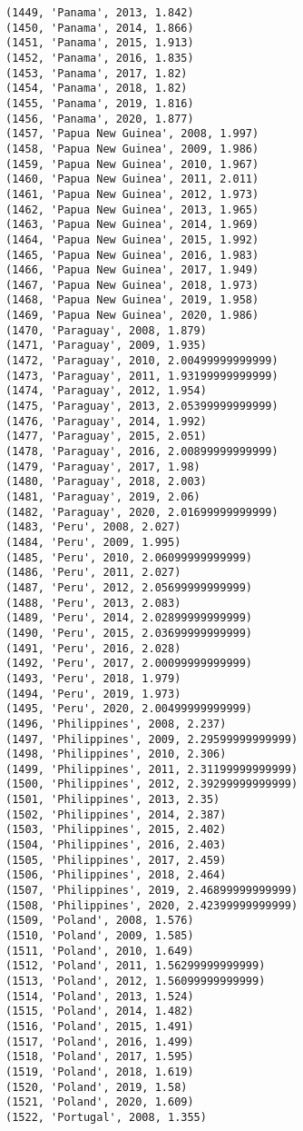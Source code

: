 \documentclass[11pt]{article}
\begin{document}
\begin{Verbatim}[commandchars=\\\{\}]
(1449, 'Panama', 2013, 1.842)
(1450, 'Panama', 2014, 1.866)
(1451, 'Panama', 2015, 1.913)
(1452, 'Panama', 2016, 1.835)
(1453, 'Panama', 2017, 1.82)
(1454, 'Panama', 2018, 1.82)
(1455, 'Panama', 2019, 1.816)
(1456, 'Panama', 2020, 1.877)
(1457, 'Papua New Guinea', 2008, 1.997)
(1458, 'Papua New Guinea', 2009, 1.986)
(1459, 'Papua New Guinea', 2010, 1.967)
(1460, 'Papua New Guinea', 2011, 2.011)
(1461, 'Papua New Guinea', 2012, 1.973)
(1462, 'Papua New Guinea', 2013, 1.965)
(1463, 'Papua New Guinea', 2014, 1.969)
(1464, 'Papua New Guinea', 2015, 1.992)
(1465, 'Papua New Guinea', 2016, 1.983)
(1466, 'Papua New Guinea', 2017, 1.949)
(1467, 'Papua New Guinea', 2018, 1.973)
(1468, 'Papua New Guinea', 2019, 1.958)
(1469, 'Papua New Guinea', 2020, 1.986)
(1470, 'Paraguay', 2008, 1.879)
(1471, 'Paraguay', 2009, 1.935)
(1472, 'Paraguay', 2010, 2.00499999999999)
(1473, 'Paraguay', 2011, 1.93199999999999)
(1474, 'Paraguay', 2012, 1.954)
(1475, 'Paraguay', 2013, 2.05399999999999)
(1476, 'Paraguay', 2014, 1.992)
(1477, 'Paraguay', 2015, 2.051)
(1478, 'Paraguay', 2016, 2.00899999999999)
(1479, 'Paraguay', 2017, 1.98)
(1480, 'Paraguay', 2018, 2.003)
(1481, 'Paraguay', 2019, 2.06)
(1482, 'Paraguay', 2020, 2.01699999999999)
(1483, 'Peru', 2008, 2.027)
(1484, 'Peru', 2009, 1.995)
(1485, 'Peru', 2010, 2.06099999999999)
(1486, 'Peru', 2011, 2.027)
(1487, 'Peru', 2012, 2.05699999999999)
(1488, 'Peru', 2013, 2.083)
(1489, 'Peru', 2014, 2.02899999999999)
(1490, 'Peru', 2015, 2.03699999999999)
(1491, 'Peru', 2016, 2.028)
(1492, 'Peru', 2017, 2.00099999999999)
(1493, 'Peru', 2018, 1.979)
(1494, 'Peru', 2019, 1.973)
(1495, 'Peru', 2020, 2.00499999999999)
(1496, 'Philippines', 2008, 2.237)
(1497, 'Philippines', 2009, 2.29599999999999)
(1498, 'Philippines', 2010, 2.306)
(1499, 'Philippines', 2011, 2.31199999999999)
(1500, 'Philippines', 2012, 2.39299999999999)
(1501, 'Philippines', 2013, 2.35)
(1502, 'Philippines', 2014, 2.387)
(1503, 'Philippines', 2015, 2.402)
(1504, 'Philippines', 2016, 2.403)
(1505, 'Philippines', 2017, 2.459)
(1506, 'Philippines', 2018, 2.464)
(1507, 'Philippines', 2019, 2.46899999999999)
(1508, 'Philippines', 2020, 2.42399999999999)
(1509, 'Poland', 2008, 1.576)
(1510, 'Poland', 2009, 1.585)
(1511, 'Poland', 2010, 1.649)
(1512, 'Poland', 2011, 1.56299999999999)
(1513, 'Poland', 2012, 1.56099999999999)
(1514, 'Poland', 2013, 1.524)
(1515, 'Poland', 2014, 1.482)
(1516, 'Poland', 2015, 1.491)
(1517, 'Poland', 2016, 1.499)
(1518, 'Poland', 2017, 1.595)
(1519, 'Poland', 2018, 1.619)
(1520, 'Poland', 2019, 1.58)
(1521, 'Poland', 2020, 1.609)
(1522, 'Portugal', 2008, 1.355)

\end{Verbatim}
\end{document}
